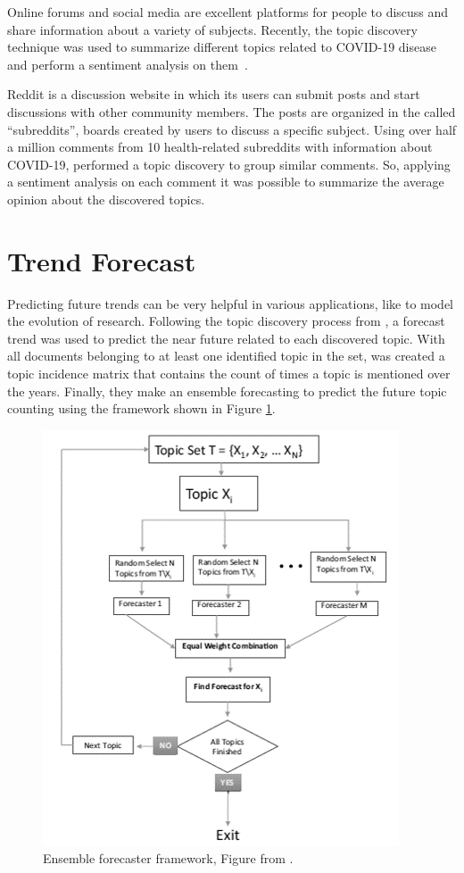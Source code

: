 Online forums and social media are excellent platforms for people to discuss and share information about a variety of subjects. Recently, the topic discovery technique was used to summarize different topics related to COVID-19 disease and perform a sentiment analysis on them~\cite{jelodar2020deep}.

Reddit is a discussion website in which its users can submit posts and start discussions with other community members. The posts are organized in the called ``subreddits'', boards created by users to discuss a specific subject. Using over half a million comments from 10 health-related subreddits with information about COVID-19,  performed a topic discovery to group similar comments. So, applying a sentiment analysis on each comment it was possible to summarize the average opinion about the discovered topics.

\section{Trend Forecast}

Predicting future trends can be very helpful in various applications, like to model the evolution of research. Following the topic discovery process from , a forecast trend was used to predict the near future related to each discovered topic. With all documents belonging to at least one identified topic in the set, was created a topic incidence matrix that contains the count of times a topic is mentioned over the years. Finally, they make an ensemble forecasting to predict the future topic counting using the framework shown in Figure \ref{fig:ensemble-forecasting-framework}.

\begin{figure}[h!]
	\centering
	\includegraphics[width=0.53\linewidth]{01.Chapters/03.RelatedWorks/ensemble-forecasting-framework}
	\caption{Ensemble forecaster framework, Figure from  \cite{hurtado2016topic}.}
	\label{fig:ensemble-forecasting-framework}
\end{figure}

